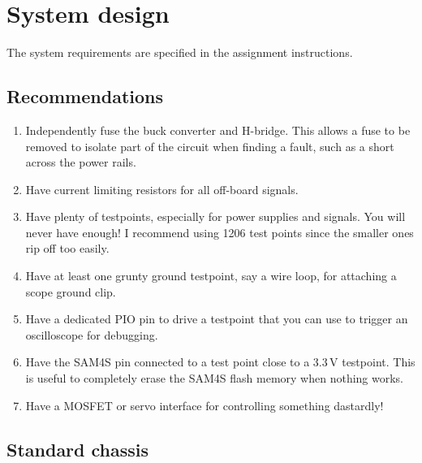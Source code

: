 \chapter{System design}
\label{hardware}

The system requirements are specified in the assignment instructions.


\section{Recommendations}\label{recommendations}

\begin{enumerate}
\item
  Independently fuse the buck converter and H-bridge. This allows a fuse
  to be removed to isolate part of the circuit when finding a fault,
  such as a short across the power rails.


\item
  Have current limiting resistors for all off-board signals.

\item
  Have plenty of testpoints, especially for power supplies and
  signals.  You will never have enough!  I recommend using 1206 test
  points since the smaller ones rip off too easily.

\item
  Have at least one grunty ground testpoint, say a wire loop, for
  attaching a scope ground clip.

\item
  Have a dedicated PIO pin to drive a testpoint that you can use to
  trigger an oscilloscope for debugging.

\item
  Have the SAM4S  pin connected to a test point close to a 3.3\,V
  testpoint. This is useful to completely erase the SAM4S flash memory
  when nothing works.

\item
  Have a MOSFET or servo interface for controlling something dastardly!

\end{enumerate}


\section{Standard chassis}

